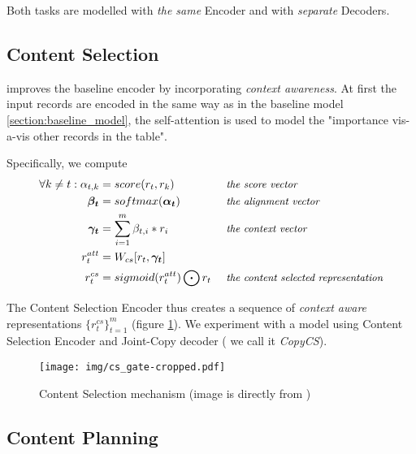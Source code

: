 Both tasks are modelled with \emph{the same} Encoder and with \emph{separate} Decoders.

\subsection{Content Selection} \label{subsection:content_selection}

\citep{puduppully2019datatotext} improves the baseline encoder by incorporating \emph{context awareness}. At first the input records are encoded in the same way as in the baseline model \ref{section:baseline_model}, the self-attention is used to model the "importance vis-a-vis other records in the table".

Specifically, we compute
\begin{align*}
\forall k \neq t : \alpha_{t, k} &= score(r_t, r_k)                         &&\mbox{ \small \emph{the score vector}}\\
\boldsymbol{\beta_t}             &= softmax(\boldsymbol{\alpha_t})                      &&\mbox{ \small \emph{the alignment vector}}\\
\boldsymbol{\gamma_t}            &= \sum_{i=1}^m{\beta_{t, i} * r_i}               &&\mbox{ \small \emph{the context vector}}\\
r_t^{att}                  &= W_{cs} [r_t, \boldsymbol{\gamma_t}]             \\
r_t^{cs}                   &= sigmoid(r_t^{att}) \bigodot r_t                  &&\mbox{ \small \emph{the content selected representation}}
\end{align*}

The Content Selection Encoder thus creates a sequence of \emph{context aware} representations $\{r_t^{cs}\}_{t=1}^m$ (figure \ref{figure:content_selection_pudupully}). We experiment with a model using Content Selection Encoder and Joint-Copy decoder ( we call it \emph{CopyCS}).

\begin{figure}[!h]
    \texttt{[image: img/cs\_gate-cropped.pdf]}
    \caption{Content Selection mechanism (image is directly from \citep{puduppully2019datatotext})} \label{figure:content_selection_pudupully}
\end{figure}

\subsection{Content Planning} \label{subsection:content_planning}


